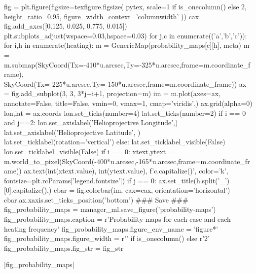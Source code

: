
\begin{pycode}[manager_ml]
fig = plt.figure(figsize=texfigure.figsize(
    pytex,
    scale=1 if is_onecolumn() else 2,
    height_ratio=0.95,
    figure_width_context='columnwidth'
))
cax = fig.add_axes([0.125, 0.025, 0.775, 0.015])
plt.subplots_adjust(wspace=0.03,hspace=0.03)
for j,c in enumerate(('a','b','c')):
    for i,h in enumerate(heating):
        m = GenericMap(probability_maps[c][h], meta)
        m = m.submap(SkyCoord(Tx=-410*u.arcsec,Ty=-325*u.arcsec,frame=m.coordinate_frame),
                     SkyCoord(Tx=-225*u.arcsec,Ty=-150*u.arcsec,frame=m.coordinate_frame))
        ax = fig.add_subplot(3, 3, 3*j+i+1, projection=m)
        im = m.plot(axes=ax, annotate=False, title=False, vmin=0, vmax=1, cmap='viridis',)
        ax.grid(alpha=0)
        lon,lat = ax.coords
        lon.set_ticks(number=4)
        lat.set_ticks(number=2)
        if i == 0 and j==2:
            lon.set_axislabel('Helioprojective Longitude',)
            lat.set_axislabel('Helioprojective Latitude', )
            lat.set_ticklabel(rotation='vertical')
        else:
            lat.set_ticklabel_visible(False)
            lon.set_ticklabel_visible(False)
        if i == 0:
            xtext,ytext = m.world_to_pixel(SkyCoord(-400*u.arcsec,-165*u.arcsec,frame=m.coordinate_frame))
            ax.text(int(xtext.value), int(ytext.value), f'{c.capitalize()}', color='k', fontsize=plt.rcParams['legend.fontsize'])
        if j == 0:
            ax.set_title(h.split('_')[0].capitalize(),)
cbar = fig.colorbar(im, cax=cax, orientation='horizontal')
cbar.ax.xaxis.set_ticks_position('bottom')
### Save ###
fig_probability_maps = manager_ml.save_figure('probability-maps')
fig_probability_maps.caption = r'Probability maps for each case and each heating frequency'
fig_probability_maps.figure_env_name = 'figure*'
fig_probability_maps.figure_width = r'\columnwidth' if is_onecolumn() else r'2\columnwidth'
fig_probability_maps.fig_str = fig_str
\end{pycode}
\py[manager_ml]|fig_probability_maps|


